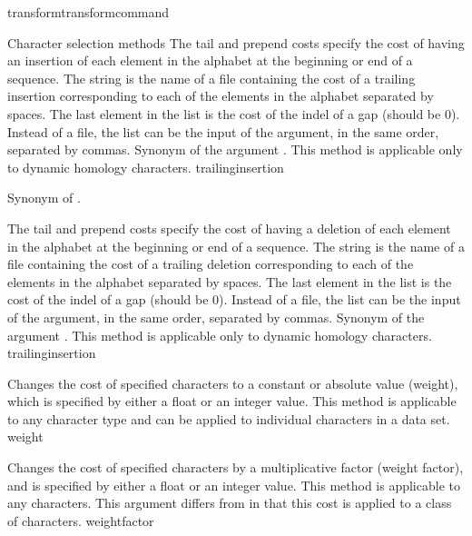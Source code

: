 \begin{command}{transform}{transformcommand}
\begin{arguments}
\begin{argumentgroup}{Character selection methods}
            {The tail and prepend costs specify the cost of having an insertion of
            each element in the alphabet at the beginning or end
            of a sequence. The string is the name of a file containing the cost of
            a trailing insertion corresponding to each of the elements
            in the alphabet separated by spaces. The last element in the list is the
            cost of the indel of a gap (should be 0). Instead of a file, the list can
            be the input of the argument, in the same order, separated by commas.
            Synonym of the argument . This method is applicable 
            only to dynamic homology characters.} 
            {trailinginsertion}

		{Synonym of  .}
		{}
		
            {The tail and prepend costs specify the cost of having a deletion
            of each element in the alphabet at the beginning or end
            of a sequence. The string is the name of a file containing the cost of
            a trailing deletion corresponding to each of the elements
            in the alphabet separated by spaces. The last element in the list is the
            cost of the indel of a gap (should be 0). Instead of a file, the list can
            be the input of the argument, in the same order, separated by commas.
            Synonym of the argument . This method is applicable 
            only to dynamic homology characters.} 
            {trailinginsertion}
            
            {Changes the cost of specified characters to a constant or absolute value 
            (weight), which is specified by either a float or an integer value. 
            This method is applicable to any character type and can be applied to individual 
            characters in a data set.} 
            {weight}

            {Changes the cost of specified characters by a multiplicative factor (weight factor), 
            and is specified by either a float or an integer value. This method is applicable to any characters.
            This argument differs from  in that this cost is applied to a class
            of characters.} 
            {weightfactor}


\end{argumentgroup}
\end{arguments}
\end{command}
